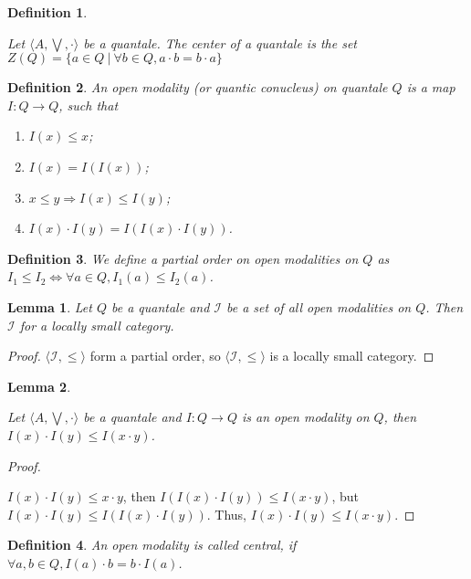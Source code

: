 \documentclass[a4paper]{article}
\newtheorem{lemma}{Lemma}
\newtheorem{defin}{Definition}
\begin{document}
\begin{defin}
$ $

  Let $\langle A, \bigvee, \cdot \rangle$ be a quantale. The center of a quantale is the set $Z(Q) = \{ a \in Q \: | \: \forall b \in Q, a \cdot b = b \cdot a \}$
\end{defin}

\begin{defin} An open modality (or quantic conucleus) on quantale $Q$ is a map $I : Q \to Q$, such that

\begin{enumerate}
  \item $I(x) \leq x$;
  \item $I(x) = I(I(x))$;
  \item $x \leq y \Rightarrow I(x) \leq I(y)$;
  \item $I(x) \cdot I(y) = I(I(x) \cdot I(y))$.
\end{enumerate}
\end{defin}

\begin{defin}
  We define a partial order on open modalities on $Q$ as $I_1 \leq I_2 \Leftrightarrow \forall a \in Q, I_1 (a) \leq I_2 (a)$.
\end{defin}

\begin{lemma}
  Let $Q$ be a quantale and $\mathcal{I}$ be a set of all open modalities on $Q$. Then $\mathcal{I}$ for a locally small category.
\end{lemma}

\begin{proof}
  $\langle \mathcal{I}, \leq \rangle$ form a partial order, so $\langle \mathcal{I}, \leq \rangle$ is a locally small category.
\end{proof}

\begin{lemma}
$ $

  Let $\langle A, \bigvee, \cdot \rangle$ be a quantale and $I : Q \to Q$ is an open modality on $Q$, then
  $I(x) \cdot I(y) \leq I(x \cdot y)$.
\end{lemma}

\begin{proof}
$ $

  $I(x) \cdot I(y) \leq x \cdot y$, then $I(I(x) \cdot I(y)) \leq I(x \cdot y)$, but
$I(x) \cdot I(y) \leq I(I(x) \cdot I(y))$. Thus, $I(x) \cdot I(y) \leq I(x \cdot y)$.
\end{proof}

\begin{defin}
  An open modality is called central, if $\forall a, b \in Q, I(a) \cdot b = b \cdot I(a)$.
\end{defin}
\end{document}
